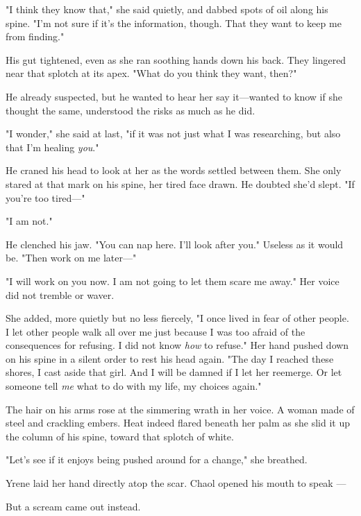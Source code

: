 "I think they know that," she said quietly, and dabbed spots of oil along his spine.
"I'm not sure if it's the information, though.
That they want to keep me from finding."

His gut tightened, even as she ran soothing hands down his back.
They lingered near that splotch at its apex.
"What do you think they want, then?"

He already suspected, but he wanted to hear her say it---wanted to know if she thought the same, understood the risks as much as he did.

"I wonder," she said at last, "if it was not just what I was researching, but also that I'm healing \emph{you}."

He craned his head to look at her as the words settled between them.
She only stared at that mark on his spine, her tired face drawn.
He doubted she'd slept.
"If you're too tired---"

"I am not."

He clenched his jaw.
"You can nap here.
I'll look after you."
Useless as it would be.
"Then work on me later---"

"I will work on you now.
I am not going to let them scare me away."
Her voice did not tremble or waver.

She added, more quietly but no less fiercely, "I once lived in fear of other people.
I let other people walk all over me just because I was too afraid of the consequences for refusing.
I did not know \emph{how} to refuse."
Her hand pushed down on his spine in a silent order to rest his head again.
"The day I reached these shores, I cast aside that girl.
And I will be damned if I let her reemerge.
Or let someone tell \emph{me} what to do with my life, my choices again."

The hair on his arms rose at the simmering wrath in her voice.
A woman made of steel and crackling embers.
Heat indeed flared beneath her palm as she slid it up the column of his spine, toward that splotch of white.

"Let's see if it enjoys being pushed around for a change," she breathed.

Yrene laid her hand directly atop the scar.
Chaol opened his mouth to speak ---

But a scream came out instead.

